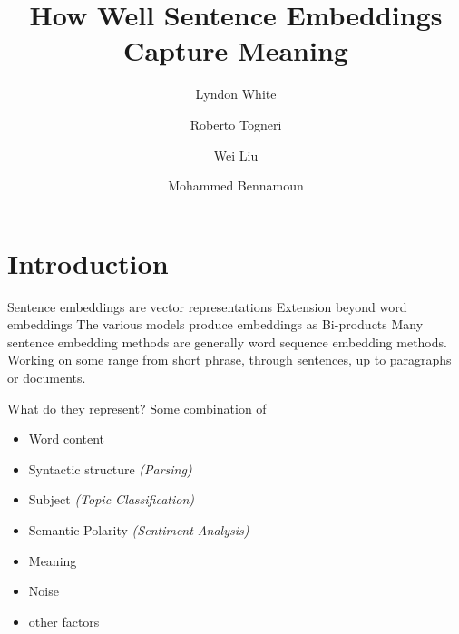 \documentclass[12pt,landscape,english]{beamer}
\newcommand{\setblockcolour}[1]{
	\setbeamercolor{block title}{bg=#1,fg=black}
	\setbeamercolor{block body}{bg=#1!15,fg=black}
}
\begin{document}

\title[White et al.]{How Well Sentence Embeddings Capture Meaning}
\author[White et al.]{Lyndon White \and Roberto Togneri \and Wei Liu \and Mohammed Bennamoun}
\date{}

\begin{frame}[plain]
	\titlepage
\end{frame}



\section{Introduction}
\begingroup %
\begin{frame}{Sentence embeddings are vector representations}
	Extension beyond word embeddings
	The various models produce embeddings as Bi-products
	Many sentence embedding methods are generally word sequence embedding methods.
	Working on some range from short phrase, through sentences, up to paragraphs or documents.
\end{frame}

\begin{frame}{What do they represent?}
	Some combination of
	\begin{itemize}
		\item Word content
		\item Syntactic structure \hfill \emph{(Parsing)}
		\item Subject \hfill \emph{(Topic Classification)}
		\item Semantic Polarity \hfill \emph{(Sentiment Analysis)}
		\item Meaning 
		\item Noise
		\item other factors
	\end{itemize}
\end{frame}

\endgroup
\end{document}
